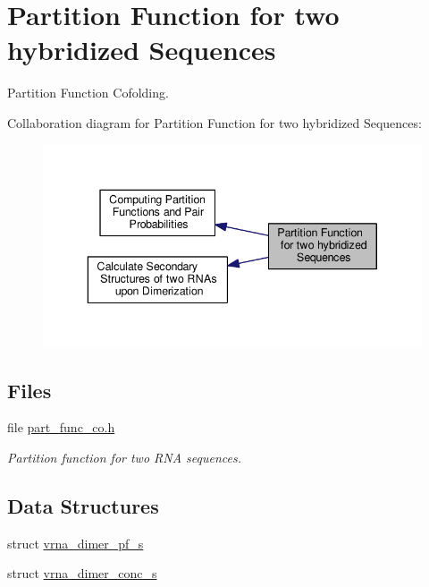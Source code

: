\hypertarget{group__pf__cofold}{\section{Partition Function for two hybridized Sequences}
\label{group__pf__cofold}
}


Partition Function Cofolding.  


Collaboration diagram for Partition Function for two hybridized Sequences\-:
\nopagebreak
\begin{figure}[H]
\begin{center}
\leavevmode
\includegraphics[width=340pt]{group__pf__cofold}
\end{center}
\end{figure}
\subsection*{Files}
\begin{DoxyCompactItemize}
\item 
file \hyperlink{part__func__co_8h}{part\-\_\-func\-\_\-co.\-h}
\begin{DoxyCompactList}\small\item\em Partition function for two R\-N\-A sequences. \end{DoxyCompactList}\end{DoxyCompactItemize}
\subsection*{Data Structures}
\begin{DoxyCompactItemize}
\item 
struct \hyperlink{group__pf__cofold_structvrna__dimer__pf__s}{vrna\-\_\-dimer\-\_\-pf\-\_\-s}
\item 
struct \hyperlink{group__pf__cofold_structvrna__dimer__conc__s}{vrna\-\_\-dimer\-\_\-conc\-\_\-s}
\end{DoxyCompactItemize}
